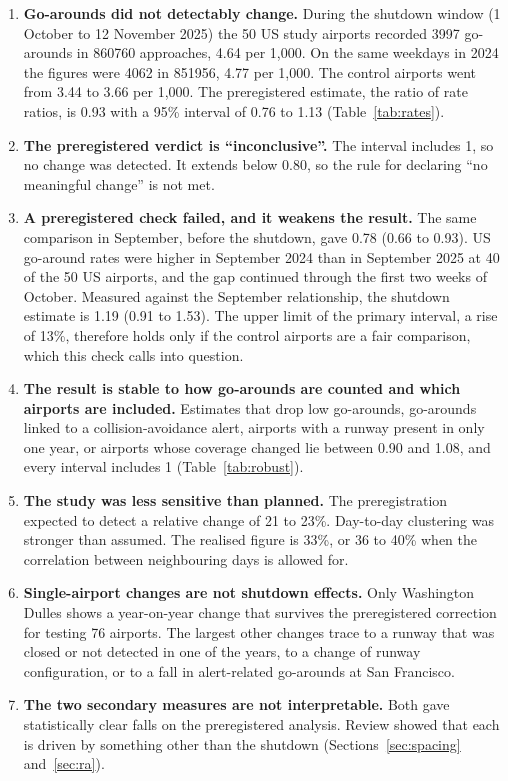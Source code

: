 \documentclass[11pt]{article}
\begin{document}
\begin{enumerate}
\item \textbf{Go-arounds did not detectably change.} During the shutdown window (1 October to 12 November 2025) the 50 US study airports recorded \num{3997} go-arounds in \num{860760} approaches, 4.64 per 1,000. On the same weekdays in 2024 the figures were \num{4062} in \num{851956}, 4.77 per 1,000. The control airports went from 3.44 to 3.66 per 1,000. The preregistered estimate, the ratio of rate ratios, is 0.93 with a 95\% interval of 0.76 to 1.13 (Table~\ref{tab:rates}).
\item \textbf{The preregistered verdict is ``inconclusive''.} The interval includes 1, so no change was detected. It extends below 0.80, so the rule for declaring ``no meaningful change'' is not met.
\item \textbf{A preregistered check failed, and it weakens the result.} The same comparison in September, before the shutdown, gave 0.78 (0.66 to 0.93). US go-around rates were higher in September 2024 than in September 2025 at 40 of the 50 US airports, and the gap continued through the first two weeks of October. Measured against the September relationship, the shutdown estimate is 1.19 (0.91 to 1.53). The upper limit of the primary interval, a rise of 13\%, therefore holds only if the control airports are a fair comparison, which this check calls into question.
\item \textbf{The result is stable to how go-arounds are counted and which airports are included.} Estimates that drop low go-arounds, go-arounds linked to a collision-avoidance alert, airports with a runway present in only one year, or airports whose coverage changed lie between 0.90 and 1.08, and every interval includes 1 (Table~\ref{tab:robust}).
\item \textbf{The study was less sensitive than planned.} The preregistration expected to detect a relative change of 21 to 23\%. Day-to-day clustering was stronger than assumed. The realised figure is 33\%, or 36 to 40\% when the correlation between neighbouring days is allowed for.
\item \textbf{Single-airport changes are not shutdown effects.} Only Washington Dulles shows a year-on-year change that survives the preregistered correction for testing 76 airports. The largest other changes trace to a runway that was closed or not detected in one of the years, to a change of runway configuration, or to a fall in alert-related go-arounds at San Francisco.
\item \textbf{The two secondary measures are not interpretable.} Both gave statistically clear falls on the preregistered analysis. Review showed that each is driven by something other than the shutdown (Sections~\ref{sec:spacing} and~\ref{sec:ra}).
\end{enumerate}
\end{document}
